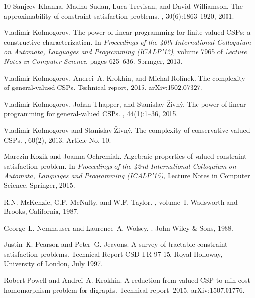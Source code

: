 \documentclass[11pt, reqno]{article}
\theoremstyle{remark}
\begin{document}
\begin{thebibliography}{10}
Sanjeev Khanna, Madhu Sudan, Luca Trevisan, and David Williamson.
\newblock The approximability of constraint satisfaction problems.
, 30(6):1863--1920, 2001.

Vladimir Kolmogorov.
\newblock The power of linear programming for finite-valued {C}{S}{P}s: a
  constructive characterization.
\newblock In {\em Proceedings of the 40th International Colloquium on Automata,
  Languages and Programming (ICALP'13)}, volume 7965 of {\em Lecture Notes in
  Computer Science}, pages 625--636. Springer, 2013.

Vladimir Kolmogorov, Andrei~A. Krokhin, and Michal Rol\'inek.
\newblock The complexity of general-valued {C}{S}{P}s.
\newblock Technical report, 2015.
\newblock arXiv:1502.07327.

Vladimir Kolmogorov, Johan Thapper, and Stanislav {\v{Z}}ivn\'y.
\newblock The power of linear programming for general-valued {C}{S}{P}s.
, 44(1):1--36, 2015.

Vladimir Kolmogorov and Stanislav {\v{Z}}ivn\'y.
\newblock The complexity of conservative valued {C}{S}{P}s.
, 60(2), 2013.
\newblock Article No. 10.

Marczin Kozik and Joanna Ochremiak.
\newblock Algebraic properties of valued constraint satisfaction problem.
\newblock In {\em Proceedings of the 42nd International Colloquium on Automata,
  Languages and Programming (ICALP'15)}, Lecture Notes in Computer Science.
  Springer, 2015.

R.N. McKenzie, G.F. McNulty, and W.F. Taylor.
, volume~I.
\newblock Wadsworth and Brooks, California, 1987.

George~L. Nemhauser and Laurence~A. Wolsey.
.
\newblock John Wiley \& Sons, 1988.

Justin~K. Pearson and Peter~G. Jeavons.
\newblock A survey of tractable constraint satisfaction problems.
\newblock Technical Report CSD-TR-97-15, Royal Holloway, University of London,
  July 1997.

Robert Powell and Andrei~A. Krokhin.
\newblock A reduction from valued {CSP} to min cost homomorphism problem for
  digraphs.
\newblock Technical report, 2015.
\newblock arXiv:1507.01776.


\end{thebibliography}
\end{document}
